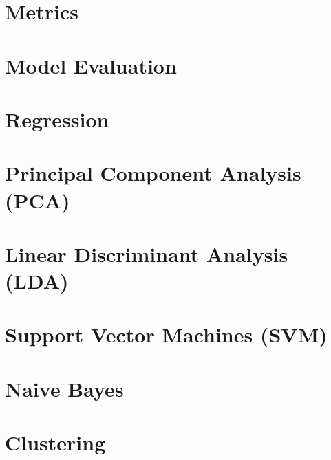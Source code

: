 \documentclass[a4paper]{book}
\begin{document}
\pagestyle{fancy}
\tableofcontents
\newpage
















\chapter{Metrics}
\framedtext{\color{red}{TODO:}}
\chapter{Model Evaluation}
\framedtext{\color{red}{TODO:}}





\chapter{Regression}
\label{ch:regression}
\framedtext{\color{red}{TODO:}}

\chapter{Principal Component Analysis (PCA)}
\label{ch:pca}
\framedtext{\color{red}{TODO:}}
\chapter{Linear Discriminant Analysis (LDA)}
\label{ch:lda}
\framedtext{\color{red}{TODO:}}
\chapter{Support Vector Machines (SVM)}
\label{ch:svm}
\framedtext{\color{red}{TODO:}}
\chapter{Naive Bayes}
\label{ch:naive-bayes}
\framedtext{\color{red}{TODO:}}
\chapter{Clustering}
\label{ch:clustering}
\framedtext{\color{red}{TODO:}}
\end{document}
